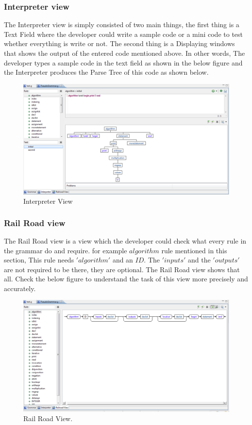 \documentclass[a4paper]{article}
\begin{document}
\subsubsection{Interpreter view}
The Interpreter view is simply consisted of two main things, the first thing is a Text Field where the developer could write a sample code or a mini code to test whether everything is write or not. The second thing is a Displaying windows that shows the output of the entered code mentioned above. In other words, The developer types a sample code in the text field as shown in the below figure and the Interpreter produces the Parse Tree of this code as shown below.
\newline
\begin{figure}[ht]
\includegraphics[width = \paperwidth]{6.png} 
\caption{Interpreter View}
\end{figure}
\newline
\subsubsection{Rail Road view}

The Rail Road view is a view which the developer could check what every rule in the grammar do and require. for example $algorithm$ rule mentioned in this section, This rule needs $'algorithm'$ and an $ID$. The $'inputs'$ and the $'outputs'$ are not required to be there, they are optional. The Rail Road view shows that all. Check the below figure to understand the task of this view more precisely and accurately.
\newline
\begin{figure}[ht]
\includegraphics[width = \paperwidth]{7.png} 
\caption{Rail Road View.}
\end{figure}
\end{document}
